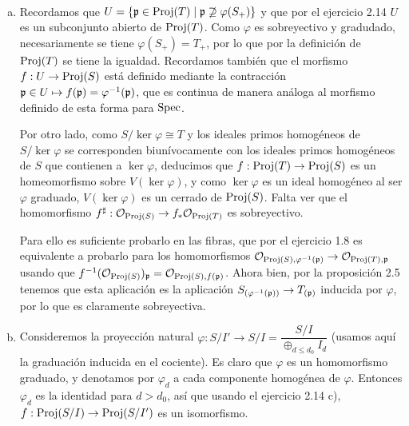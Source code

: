 \documentclass[twoside]{article}
\begin{document}
\begin{solucion}\
\begin{enumerate}[(a)]
\item Recordamos que $U=\{\mathfrak{p}\in\operatorname{Proj}(T)\mid \mathfrak{p}\not\supseteq\varphi(S_+)\}$ y que por el ejercicio 2.14 $U$ es un subconjunto abierto de $\operatorname{Proj}(T)$. Como $\varphi$ es sobreyectivo y gradudado, necesariamente se tiene $\varphi(S_+)=T_+$, por lo que por la definición de $\operatorname{Proj}(T)$ se tiene la igualdad. Recordamos también que el morfismo $f:U\to\operatorname{Proj}(S)$ está definido mediante la contracción $\mathfrak{p}\in U\mapsto f(\mathfrak{p})=\varphi^{-1}(\mathfrak{p})$, que es continua de manera análoga al morfismo definido de esta forma para $\operatorname{Spec}$. 

Por otro lado, como $S/\ker\varphi\cong T$ y los ideales primos homogéneos de $S/\ker\varphi$ se corresponden biunívocamente con los ideales primos homogéneos de $S$ que contienen a $\ker\varphi$, deducimos que $f:\operatorname{Proj}(T)\to\operatorname{Proj}(S)$ es un homeomorfismo sobre $V(\ker\varphi)$, y como $\ker\varphi$ es un ideal homogéneo al ser $\varphi$ graduado, $V(\ker\varphi)$ es un cerrado de $\operatorname{Proj}(S)$. Falta ver que el homomorfismo $f^\sharp:{\mathcal O}_{\operatorname{Proj}(S)}\to f_*{\mathcal O}_{\operatorname{Proj}(T)}$ es sobreyectivo. 

Para ello es suficiente probarlo en las fibras, que por el ejercicio 1.8 es equivalente a probarlo para los homomorfismos ${\mathcal O}_{\operatorname{Proj}(S),\varphi^{-1}(\mathfrak{p})}\to{\mathcal O}_{\operatorname{Proj}(T),\mathfrak{p}}$ usando que $f^{-1}({\mathcal O}_{\operatorname{Proj}(S)})_{\mathfrak{p}}={\mathcal O}_{\operatorname{Proj}(S),f(\mathfrak{p})}$. Ahora bien, por la proposición 2.5 tenemos que esta aplicación es la aplicación $S_{(\varphi^{-1}(\mathfrak{p}))}\to T_{(\mathfrak{p})}$ inducida por $\varphi$, por lo que es claramente sobreyectiva.



\item Consideremos la proyección natural $\varphi:S/I'\to S/I=\dfrac{S/I}{\oplus_{d\leq d_0}I_d}$ (usamos aquí la graduación inducida en el cociente). Es claro que $\varphi$ es un homomorfismo graduado, y denotamos por $\varphi_d$ a cada componente homogénea de $\varphi$. Entonces $\varphi_d$ es la identidad para $d>d_0$, así que usando el ejercicio 2.14 c), $f:\operatorname{Proj}(S/I)\to\operatorname{Proj}(S/I')$ es un isomorfismo. 

\end{enumerate}

\end{solucion}
%
%
\end{document}
